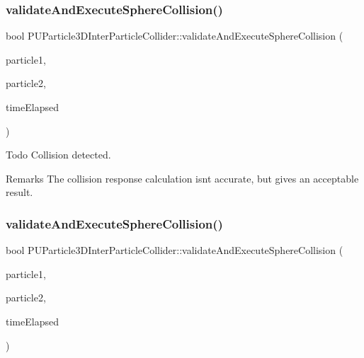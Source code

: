 \subsubsection{\texorpdfstring{validate\+And\+Execute\+Sphere\+Collision()}{validateAndExecuteSphereCollision()}\hspace{0.1cm}{\footnotesize\ttfamily [1/2]}}
{\footnotesize\ttfamily bool P\+U\+Particle3\+D\+Inter\+Particle\+Collider\+::validate\+And\+Execute\+Sphere\+Collision (\begin{DoxyParamCaption}\item[{\hyperlink{structPUParticle3D}{P\+U\+Particle3D} $\ast$}]{particle1,  }\item[{\hyperlink{structPUParticle3D}{P\+U\+Particle3D} $\ast$}]{particle2,  }\item[{float}]{time\+Elapsed }\end{DoxyParamCaption})\hspace{0.3cm}{\ttfamily [protected]}}

Todo Collision detected. \begin{DoxyRemark}{Remarks}
The collision response calculation isn\textquotesingle{}t accurate, but gives an acceptable result.
\end{DoxyRemark}
\mbox{\label{classPUParticle3DInterParticleCollider_aca01144b3d2a99c3148932bc8ec9bf05}} 
\subsubsection{\texorpdfstring{validate\+And\+Execute\+Sphere\+Collision()}{validateAndExecuteSphereCollision()}\hspace{0.1cm}{\footnotesize\ttfamily [2/2]}}
{\footnotesize\ttfamily bool P\+U\+Particle3\+D\+Inter\+Particle\+Collider\+::validate\+And\+Execute\+Sphere\+Collision (\begin{DoxyParamCaption}\item[{\hyperlink{structPUParticle3D}{P\+U\+Particle3D} $\ast$}]{particle1,  }\item[{\hyperlink{structPUParticle3D}{P\+U\+Particle3D} $\ast$}]{particle2,  }\item[{float}]{time\+Elapsed }\end{DoxyParamCaption})\hspace{0.3cm}{\ttfamily [protected]}}


